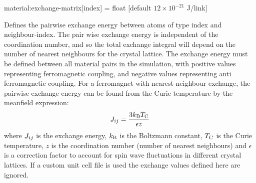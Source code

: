 {\zicf material:exchange-matrix[index] = float [default $12 \times 10^{-21}$ J/link]} Defines the pairwise exchange energy between atoms of type index and neighbour-index. The pair wise exchange energy is independent of the coordination number, and so the total exchange integral will depend on the number of nearest neighbours for the crystal lattice. The exchange energy must be defined between all material pairs in the simulation, with positive values representing ferromagnetic coupling, and negative values representing anti ferromagnetic coupling. For a ferromagnet with nearest neighbour exchange, the pairwise exchange energy can be found from the Curie temperature by the meanfield expression:
\begin{equation*}
J_{ij} = \frac{3k_\mathrm{B}T_{\mathrm{C}}}{\epsilon z}
\end{equation*}
where $J_{ij}$ is the exchange energy, $k_\mathrm{B}$ is the Boltzmann constant, $T_{\mathrm{C}}$ is the Curie temperature, $z$ is the coordination number (number of nearest neighbours) and $\epsilon$ is a correction factor to account for spin wave fluctuations in different crystal lattices. If a custom unit cell file is used the exchange values defined here are ignored.\\



